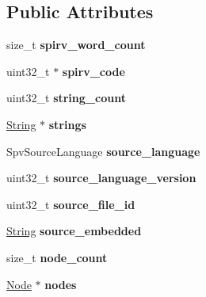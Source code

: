 \subsection*{Public Attributes}
\begin{DoxyCompactItemize}
\item 
\mbox{\label{structParser_a8c7d9bad09cf5b1fd73f8e1d8ce2b48b}} 
size\+\_\+t {\bfseries spirv\+\_\+word\+\_\+count}
\item 
\mbox{\label{structParser_aeadf09df8afc0b8a603e131adf5ff0b8}} 
uint32\+\_\+t $\ast$ {\bfseries spirv\+\_\+code}
\item 
\mbox{\label{structParser_a14d3c9630929049f1167d5cc387f3768}} 
uint32\+\_\+t {\bfseries string\+\_\+count}
\item 
\mbox{\label{structParser_a70b900b64261dad32d38b46e3fc3872f}} 
\hyperlink{structString}{String} $\ast$ {\bfseries strings}
\item 
\mbox{\label{structParser_a39620b44628ba93f6794b22134efd274}} 
Spv\+Source\+Language {\bfseries source\+\_\+language}
\item 
\mbox{\label{structParser_a42828125be2334af86f8318750d86c38}} 
uint32\+\_\+t {\bfseries source\+\_\+language\+\_\+version}
\item 
\mbox{\label{structParser_aa0e7f528925a70a6cf21482a6de1f23e}} 
uint32\+\_\+t {\bfseries source\+\_\+file\+\_\+id}
\item 
\mbox{\label{structParser_a1cdd0475bd06a0b865752800b4348bc9}} 
\hyperlink{structString}{String} {\bfseries source\+\_\+embedded}
\item 
\mbox{\label{structParser_a9d1349b288212717ff9697568ebbd271}} 
size\+\_\+t {\bfseries node\+\_\+count}
\item 
\mbox{\label{structParser_ad37f5ed7694759eadc2cb823efdd0ee8}} 
\hyperlink{structNode}{Node} $\ast$ {\bfseries nodes}
\item 
\mbox{\label{structParser_ac344c694f339564a58e9a7b486f35eaf}} 

\end{DoxyCompactItemize}
